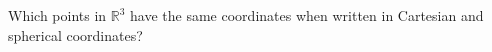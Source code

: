 \begin{problem}
\begin{problem}
Which points in $\mathbb{R}^3$ have the same coordinates when written in Cartesian and spherical coordinates?
\end{problem}
\end{problem}
